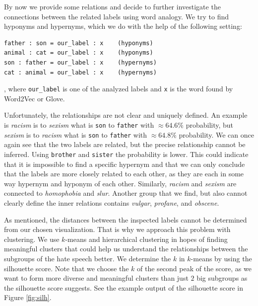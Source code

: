 \documentclass[fleqn,moreauthors,10pt]{ds_report}
\begin{document}
By now we provide some relations and decide to further investigate the connections between the related labels using word analogy. We try to find hyponyms and hypernyms, which we do with the help of the following setting:
\begin{verbatim}
father : son = our_label : x 	(hyponyms)
animal : cat = our_label : x 	(hyponyms)
son : father = our_label : x 	(hypernyms)
cat : animal = our_label : x 	(hypernyms)
\end{verbatim},
where \texttt{our\_label} is one of the analyzed labels and \texttt{x} is the word found by Word2Vec or Glove. 

Unfortunately, the relationships are not clear and uniquely defined. An example is \textit{racism} is to \textit{sexism} what is \texttt{son} to \texttt{father} with $\approx 64.6\%$ probability, but \textit{sexism} is to \textit{racism} what is \texttt{son} to \texttt{father} with $\approx 64.8\%$ probability. We can once again see that the two labels are related, but the precise relationship cannot be inferred. Using \texttt{brother} and \texttt{sister} the probability is lower. This could indicate that it is impossible to find a specific hypernym and that we can only conclude that the labels are more closely related to each other, as they are each in some way hypernym and hyponym of each other. Similarly, \textit{racism} and \textit{sexism} are connected to \textit{homophobia} and \textit{slur}. Another group that we find, but also cannot clearly define the inner relations contains \textit{vulgar}, \textit{profane}, and \textit{obscene}.

As mentioned, the distances between the inspected labels cannot be determined from our chosen visualization. That is why we approach this problem with clustering. We use $k$-means and hierarchical clustering in hopes of finding meaningful clusters that could help us understand the relationships between the subgroups of the hate speech better. We determine the $k$ in $k$-means by using the silhouette score. Note that we choose the $k$ of the second peak of the score, as we want to form more diverse and meaningful clusters than just $2$ big subgroups as the silhouette score suggests. See the example output of the silhouette score in Figure \ref{fig:silh}.
\end{document}
